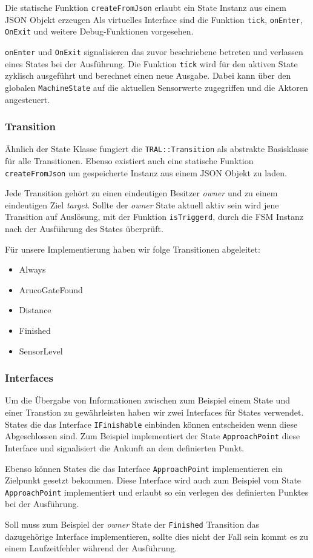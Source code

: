Die statische Funktion \texttt{createFromJson} erlaubt ein State Instanz aus einem JSON Objekt erzeugen Als virtuelles Interface sind die Funktion \texttt{tick}, \texttt{onEnter}, \texttt{OnExit} und weitere Debug-Funktionen vorgesehen.

\texttt{onEnter} und \texttt{OnExit} signalisieren das zuvor beschriebene betreten und verlassen eines States bei der Ausführung. Die Funktion \texttt{tick} wird für den aktiven State zyklisch ausgeführt und berechnet einen neue Ausgabe. Dabei kann über den globalen \texttt{MachineState} auf die aktuellen Sensorwerte zugegriffen und die Aktoren angesteuert.


\subsubsection{Transition}
Ähnlich der State Klasse fungiert die \texttt{TRAL::Transition} als abstrakte Basisklasse für alle Transitionen. Ebenso existiert auch eine statische Funktion \texttt{createFromJson} um gespeicherte Instanz aus einem JSON Objekt zu laden. 

Jede Transition gehört zu einen eindeutigen Besitzer \textit{owner} und zu einem eindeutigen Ziel \textit{target}. Sollte der \textit{owner} State aktuell aktiv sein wird jene Transition auf Auslösung, mit der Funktion \texttt{isTriggerd}, durch die FSM Instanz nach der Ausführung des States überprüft.

Für unsere Implementierung haben wir folge Transitionen abgeleitet:

\begin{itemize}
	\item Always
	\item ArucoGateFound
	\item Distance
	\item Finished
	\item SensorLevel
\end{itemize}

\subsubsection{Interfaces}

Um die Übergabe von Informationen zwischen zum Beispiel einem State und einer Transtion zu gewährleisten haben wir zwei Interfaces für States verwendet. 
States die das Interface \texttt{IFinishable} einbinden können entscheiden wenn diese Abgeschlossen sind. Zum Beispiel implementiert der State \texttt{ApproachPoint} diese Interface und signalisiert die Ankunft an dem definierten Punkt.

Ebenso können States die das Interface \texttt{ApproachPoint} implementieren ein Zielpunkt gesetzt bekommen. Diese Interface wird auch zum Beispiel vom State \texttt{ApproachPoint} implementiert und erlaubt so ein verlegen des definierten Punktes bei der Ausführung.

Soll muss zum Beispiel der \textit{owner} State der \texttt{Finished} Transition das dazugehörige Interface implementieren, sollte dies nicht der Fall sein kommt es zu einem Laufzeitfehler während der Ausführung.
